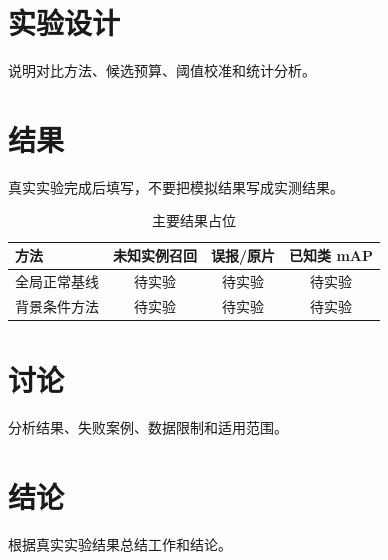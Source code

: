 \documentclass[UTF8,a4paper,12pt]{ctexart}
\begin{document}
\section{实验设计}
说明对比方法、候选预算、阈值校准和统计分析。

\section{结果}
真实实验完成后填写，不要把模拟结果写成实测结果。

\begin{table}[htbp]
\centering
\caption{主要结果占位}
\begin{tabular}{lccc}
\toprule
方法 & 未知实例召回 & 误报/原片 & 已知类 mAP \\
\midrule
全局正常基线 & 待实验 & 待实验 & 待实验 \\
背景条件方法 & 待实验 & 待实验 & 待实验 \\
\bottomrule
\end{tabular}
\end{table}

\section{讨论}
分析结果、失败案例、数据限制和适用范围。

\section{结论}
根据真实实验结果总结工作和结论。



\end{document}
